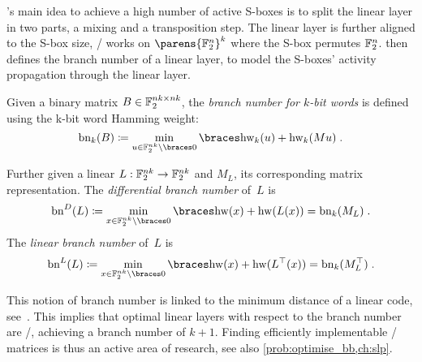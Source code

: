 \citeauthor{PhD:Daemen95}'s main idea to achieve a high number of active S-boxes is to split the linear layer in two parts, a mixing and a transposition step.
The linear layer is further aligned to the S-box size, \ie/ works on $\parens{\F_2^n}^k$ where the S-box permutes $\mathbb{F}_2^n$.
\citeauthor{PhD:Daemen95} then defines the branch number of a linear layer, to model the S-boxes' activity propagation through the linear layer.
\begin{definition}
    Given a binary matrix $B \in \mathbb{F}_2^{nk \times nk}$, the \emph{branch number for $k$-bit words} is defined using the k-bit word Hamming weight:
    \begin{equation*}
        \mathrm{bn}_k(B) \coloneqq \min_{u \in \F_2^{nk} \setminus \set{0}}\set{\mathrm{hw}_k(u)+\mathrm{hw}_k(Mu)}\;.
    \end{equation*}

    Further given a linear $L : \mathbb{F}_2^{nk} \to \mathbb{F}_2^{nk}$ and $M_L$, its corresponding matrix representation.
    The \emph{differential branch number} of~$L$ is
    \begin{equation*}
        \mathrm{bn}^D(L) \coloneqq \min_{x \in \F_2^{nk} \setminus \set{0}} \set{\mathrm{hw}(x) + \mathrm{hw}(L(x))} = \mathrm{bn}_k(M_L)\;.
    \end{equation*}
    The \emph{linear branch number} of~$L$ is
    \begin{equation*}
        \mathrm{bn}^L(L) \coloneqq \min_{x \in \F_2^{nk} \setminus \set{0}} \set{\mathrm{hw}(x) + \mathrm{hw}(L^\top(x))} = \mathrm{bn}_k(M_L^\top)\;.
    \end{equation*}
\end{definition}

This notion of branch number is linked to the minimum distance of a linear code, see~\cite{FSE:RDPBD96}.
This implies that optimal linear layers with respect to the branch number are \MDS/, achieving a branch number of $k+1$.
Finding efficiently implementable \MDS/ matrices is thus an active area of research, see also \cref{prob:optimise_bb,ch:slp}.

